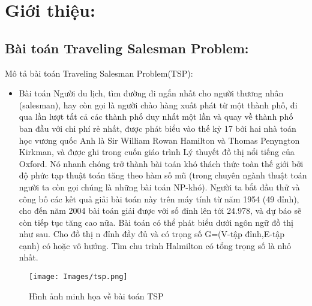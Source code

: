 \documentclass[a4paper]{article}
\begin{document}
\section{Giới thiệu:}\label{control}

\subsection{Bài toán Traveling Salesman Problem: }\label{control}
Mô tả bài toán Traveling Salesman Problem(TSP):\cite{TravelingSalesman}
 \begin{itemize}
    \item  Bài toán Người du lịch, tìm đường đi ngắn nhất cho người thương nhân (salesman), hay còn gọi là người chào hàng xuất phát từ một thành phố, đi qua lần lượt tất cả các thành phố duy nhất một lần và quay về thành phố ban đầu với chi phí rẻ nhất, được phát biểu vào thế kỷ 17 bởi hai nhà toán học vương quốc Anh là Sir William Rowan Hamilton và Thomas Penyngton Kirkman, và được ghi trong cuốn giáo trình Lý thuyết đồ thị nổi tiếng của Oxford. Nó nhanh chóng trở thành bài toán khó thách thức toàn thế giới bởi độ phức tạp thuật toán tăng theo hàm số mũ (trong chuyên ngành thuật toán người ta còn gọi chúng là những bài toán NP-khó). Người ta bắt đầu thử và công bố các kết quả giải bài toán này trên máy tính từ năm 1954 (49 đỉnh), cho đến năm 2004 bài toán giải được với số đỉnh lên tới 24.978, và dự báo sẽ còn tiếp tục tăng cao nữa. Bài toán có thể phát biểu dưới ngôn ngữ đồ thị như sau. Cho đồ thị n đỉnh đầy đủ và có trọng số G=(V-tập đỉnh,E-tập cạnh) có hoặc vô hướng. Tìm chu trình Halmilton có tổng trọng số là nhỏ nhất.
     \end{itemize}
\begin{figure}[h]
    \centering
    \texttt{[image: Images/tsp.png]}
    \caption{Hình ảnh minh họa về bài toán TSP}
    \label{fig:tsp}
\end{figure}
\end{document}
